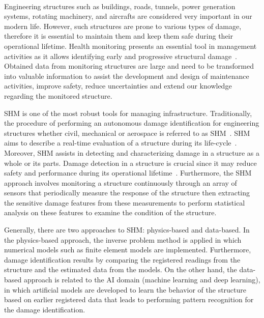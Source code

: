 \paragraph{}
Engineering structures such as buildings, roads, tunnels, power generation systems, rotating machinery, and aircrafts are considered very important in our modern life.
However, such structures are prone to various types of damage, therefore it is essential to maintain them and keep them safe during their operational lifetime.
Health monitoring presents an essential tool in management activities as it allows identifying early and progressive structural damage~\cite{Farrar2007}. 
Obtained data from monitoring structures are large and need to be transformed into valuable information to assist the development and design of maintenance activities, improve safety, reduce uncertainties and extend our knowledge regarding the monitored structure.

SHM is one of the most robust tools for managing infrastructure.
Traditionally, the procedure of performing an autonomous damage identification for engineering structures whether civil, mechanical or aerospace is referred to as SHM~\cite{farrar2001vibration}.
SHM aims to describe a real-time evaluation of a structure during its life-cycle~\cite{Balageas2010}. 
Moreover, SHM assists in detecting and characterizing damage in a structure as a whole or its parts. 
Damage detection in a structure is crucial since it may reduce safety and performance during its operational lifetime~\cite{Yuan2016}.
Furthermore, the SHM approach involves monitoring a structure continuously through an array of sensors that periodically measure the response of the structure then extracting the sensitive damage features from these measurements to perform statistical analysis on these features to examine the condition of the structure.

Generally, there are two approaches to SHM: physics-based and
data-based.
In the physics-based approach, the inverse problem method is applied in which numerical models such as finite element models are implemented. 
Furthermore, damage identification results by comparing the registered readings from the structure and the estimated data from the models.
On the other hand,  the data-based approach is related to the AI domain (machine learning and deep learning), in which artificial models are developed to learn the behavior of the structure based on earlier registered data that leads to performing pattern recognition for the damage identification.

